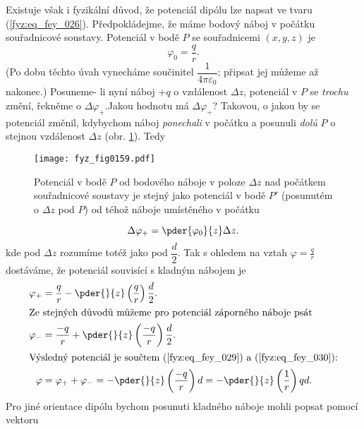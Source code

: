   Existuje však i fyzikální důvod, že potenciál dipólu lze napsat ve tvaru (\ref{fyz:eq_fey_026}).
  Předpokládejme, že máme bodový náboj v počátku souřadnicové soustavy. Potenciál v bodě \(P\) se
  souřadnicemi \((x,y,z)\) je
  \begin{equation}\label{fyz:eq_fey_027}
    \varphi_0 = \frac{q}{r}.
  \end{equation}
  (Po dobu těchto úvah vynecháme součinitel \(\dfrac{1}{4\pi\varepsilon_0}\); připsat jej můžeme až
  nakonec.) Posuneme- li nyní náboj \(+q\) o vzdálenost \(\Delta z\), potenciál v \(P\) se
  \emph{trochu} změní, řekněme o \(\Delta\varphi_+\).Jakou hodnotu má \(\Delta\varphi_+\)? Takovou,
  o jakou by se potenciál změnil, kdybychom náboj \emph{ponechali} v počátku a posunuli \emph{dolů}
  \(P\) o stejnou vzdálenost \(\Delta z\) (obr. \ref{fyz:fig0159}). Tedy
  \begin{figure}[ht!]
    \centering
    \texttt{[image: fyz\_fig0159.pdf]}
    \caption{Potenciál v bodě \(P\) od bodového náboje v poloze \(\Delta z\) nad počátkem
             souřadnicové soustavy je stejný jako potenciál v bodě \(P'\) (posunutém o \(\Delta z\)
             pod \(P\)) od téhož náboje umístěného v počátku}
    \label{fyz:fig0159}
  \end{figure}
  \begin{equation}\label{fyz:eq_fey_028}
    \Delta\varphi_+ = \pder{\varphi_0}{z}\Delta z.
  \end{equation}
  kde pod \(\Delta z\) rozumíme totéž jako pod \(\dfrac{d}{2}\). Tak s ohledem na vztah 
  \(\varphi = \frac{q}{r}\) dostáváme, že potenciál souvisící s kladným nábojem je
  \begin{align}
    \varphi_+ &= \frac{q}{r} - 
                 \pder{ }{z}\left(\frac{q}{r}\right)\frac{d}{2}.  \label{fyz:eq_fey_029} \\
    \shortintertext{Ze stejných důvodů můžeme pro potenciál záporného náboje psát}
    \varphi_- &= \frac{-q}{r} + 
                 \pder{ }{z}\left(\frac{-q}{r}\right)\frac{d}{2}. \label{fyz:eq_fey_030} \\
    \shortintertext{Výsledný potenciál je součtem (\ref{fyz:eq_fey_029}) a 
                    (\ref{fyz:eq_fey_030}):}
    \varphi   &= \varphi_+ + \varphi_- = 
                 - \pder{ }{z}\left(\frac{-q}{r}\right)d = 
                 - \pder{ }{z}\left(\frac{1}{r}\right)qd.         \label{fyz:eq_fey_031}
  \end{align}
  Pro jiné orientace dipólu bychom posunuti kladného náboje mohli popsat pomocí vektoru 
